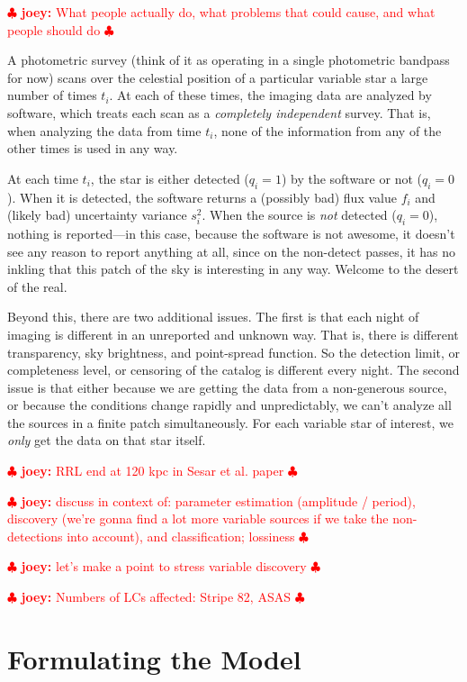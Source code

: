 \documentclass[12pt,preprint]{aastex}
\newcommand{\joey}[1] { \textcolor{red} {
\ensuremath{\clubsuit} {\bf joey:}  {#1}
\ensuremath{\clubsuit} } }%
\begin{document}
\joey{What people actually do, what problems that could cause, and what people should do}

A photometric survey (think of it as operating in a single photometric
bandpass for now) scans over the celestial position of a particular
variable star  a large number of times $t_i$.  At each of these
times, the imaging data are analyzed by software, which
treats each scan as a \emph{completely independent} survey.  That is,
when analyzing the data from time $t_i$, none of the information from
any of the other times is used in any way.




At each time $t_i$, the star is either detected ($q_i=1$) by the
software or not ($q_i=0$).  When it is detected, the software returns
a (possibly bad) flux value $f_i$ and (likely bad) uncertainty
variance $s_i^2$.  When the source is \emph{not} detected ($q_i=0$),
nothing is reported---in this case, because the software is not
awesome, it doesn't see any reason to report anything at all, since on
the non-detect passes, it has no inkling that this patch of the sky is
interesting in any way.  Welcome to the desert of the real.

Beyond this, there are two additional issues.  The first is that each
night of imaging is different in an unreported and unknown way.  That
is, there is different transparency, sky brightness, and point-spread
function.  So the detection limit, or completeness level, or censoring
of the catalog is different every night.  The second issue is that
either because we are getting the data from a non-generous source, or
because the conditions change rapidly and unpredictably, we can't
analyze all the sources in a finite patch simultaneously.  For each
variable star of interest, we \emph{only} get the data on that star
itself.

\joey{RRL end at 120 kpc in Sesar et al. paper}

\joey{discuss in context of: parameter estimation (amplitude / period), discovery (we're gonna find a lot more variable sources if we take the non-detections into account), and classification; lossiness}

\joey{let's make a point to stress variable discovery}

\joey{Numbers of LCs affected: Stripe 82, ASAS}




\section{Formulating the Model}
\label{sec:model}
\end{document}
